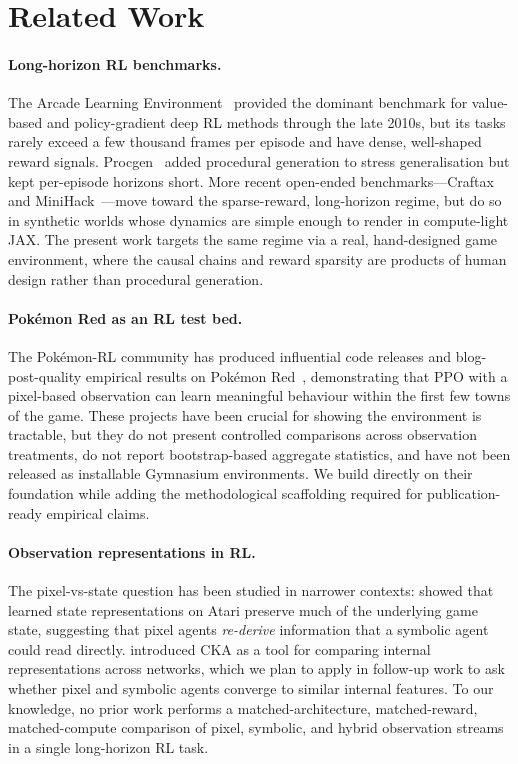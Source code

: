 \section{Related Work}
\label{sec:related-work}

\paragraph{Long-horizon RL benchmarks.}
The Arcade Learning Environment~\citep{bellemare2013arcade} provided
the dominant benchmark for value-based and policy-gradient deep RL
methods through the late 2010s, but its tasks rarely exceed a few
thousand frames per episode and have dense, well-shaped reward
signals.  Procgen~\citep{cobbe2020procgen} added procedural generation
to stress generalisation but kept per-episode horizons short.  More
recent open-ended benchmarks---Craftax~\citep{matthews2024craftax} and
MiniHack~\citep{samvelyan2021minihack}---move toward the
sparse-reward, long-horizon regime, but do so in synthetic worlds whose
dynamics are simple enough to render in compute-light JAX.  The
present work targets the same regime via a real, hand-designed game
environment, where the causal chains and reward sparsity are products
of human design rather than procedural generation.

\paragraph{Pok\'emon Red as an RL test bed.}
The Pok\'emon-RL community has produced influential code releases and
blog-post-quality empirical results on Pok\'emon
Red~\citep{whitney2023pokemonrl,pokemonred_experiments}, demonstrating
that PPO with a pixel-based observation can learn meaningful behaviour
within the first few towns of the game.  These projects have been
crucial for showing the environment is tractable, but they do not
present controlled comparisons across observation treatments, do not
report bootstrap-based aggregate statistics, and have not been
released as installable Gymnasium environments.  We build directly on
their foundation while adding the methodological scaffolding required
for publication-ready empirical claims.

\paragraph{Observation representations in RL.}
The pixel-vs-state question has been studied in narrower contexts:
\citet{anand2019unsupervised} showed that learned state representations
on Atari preserve much of the underlying game state, suggesting that
pixel agents \emph{re-derive} information that a symbolic agent could
read directly.  \citet{kornblith2019cka} introduced CKA as a tool for
comparing internal representations across networks, which we plan to
apply in follow-up work to ask whether pixel and symbolic agents
converge to similar internal features.  To our knowledge, no prior
work performs a matched-architecture, matched-reward, matched-compute
comparison of pixel, symbolic, and hybrid observation streams in a
single long-horizon RL task.

